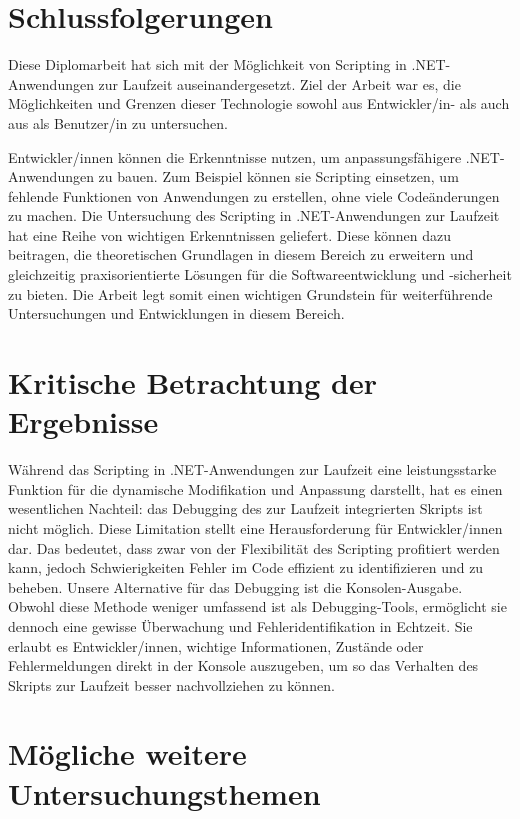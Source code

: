 \section{Schlussfolgerungen}

Diese Diplomarbeit hat sich mit der Möglichkeit von Scripting in .NET-Anwendungen zur 
Laufzeit auseinandergesetzt. Ziel der Arbeit war es, die Möglichkeiten und Grenzen dieser 
Technologie sowohl aus Entwickler/in- als auch aus als Benutzer/in zu untersuchen.

Entwickler/innen können die Erkenntnisse nutzen, um anpassungsfähigere .NET-Anwendungen zu bauen. 
Zum Beispiel können sie Scripting einsetzen, um fehlende Funktionen von Anwendungen zu erstellen, 
ohne viele Codeänderungen zu machen. Die Untersuchung des Scripting in .NET-Anwendungen zur 
Laufzeit hat eine Reihe von wichtigen Erkenntnissen geliefert. 
Diese können dazu beitragen, die theoretischen Grundlagen in diesem Bereich zu erweitern 
und gleichzeitig praxisorientierte Lösungen für die Softwareentwicklung und -sicherheit zu bieten.
Die Arbeit legt somit einen wichtigen Grundstein für weiterführende 
Untersuchungen und Entwicklungen in diesem Bereich.


\newpage
\section{Kritische Betrachtung der Ergebnisse}

Während das Scripting in .NET-Anwendungen zur Laufzeit eine leistungsstarke Funktion für die 
dynamische Modifikation und Anpassung darstellt, hat es einen wesentlichen Nachteil: 
das Debugging des zur Laufzeit integrierten Skripts ist nicht möglich. Diese Limitation 
stellt eine Herausforderung für Entwickler/innen dar. Das bedeutet, dass zwar von der Flexibilität 
des Scripting profitiert werden kann, jedoch Schwierigkeiten Fehler im Code effizient zu 
identifizieren und zu beheben. Unsere Alternative für das Debugging ist die Konsolen-Ausgabe. 
Obwohl diese Methode weniger umfassend ist als Debugging-Tools, ermöglicht sie dennoch eine 
gewisse Überwachung und Fehleridentifikation in Echtzeit. Sie erlaubt es Entwickler/innen, 
wichtige Informationen, Zustände oder Fehlermeldungen direkt in der Konsole auszugeben, 
um so das Verhalten des Skripts zur Laufzeit besser nachvollziehen zu können.

\newpage
\section{Mögliche weitere Untersuchungsthemen}


